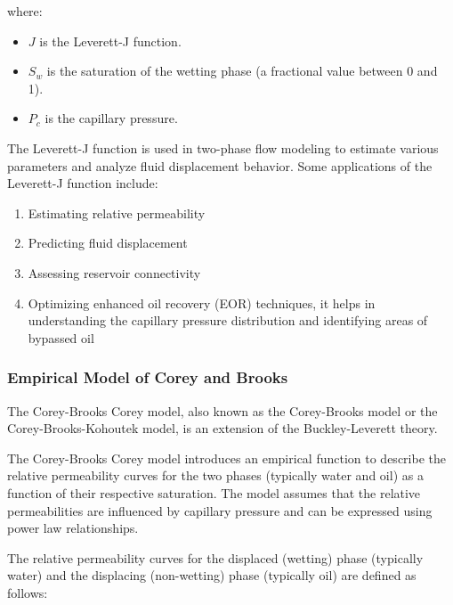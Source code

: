 		where:
		\begin{itemize}
			\item 	 \( J \) is the Leverett-J function.
			
			\item \( S_w \) is the saturation of the wetting phase (a fractional value between 0 and 1).
			
			\item \( P_c \) is the capillary pressure.
			
		\end{itemize}

		The Leverett-J function is used in two-phase flow modeling to estimate various parameters and analyze fluid displacement behavior. Some applications of the Leverett-J function include:
		
		\begin{enumerate}
			\item Estimating relative permeability
			
			\item Predicting fluid displacement
			
			\item Assessing reservoir connectivity
			
			\item Optimizing enhanced oil recovery (EOR) techniques, it helps in understanding the capillary pressure distribution and identifying areas of bypassed oil
			
		\end{enumerate}
	
	\subsubsection{Empirical Model of Corey and Brooks}
		The Corey-Brooks Corey model, also known as the Corey-Brooks model or the Corey-Brooks-Kohoutek model, is an extension of the Buckley-Leverett theory.

		The Corey-Brooks Corey model introduces an empirical function to describe the relative permeability curves for the two phases (typically water and oil) as a function of their respective saturation. The model assumes that the relative permeabilities are influenced by capillary pressure and can be expressed using power law relationships.
		
		The relative permeability curves for the displaced (wetting) phase (typically water) and the displacing (non-wetting) phase (typically oil) are defined as follows:

